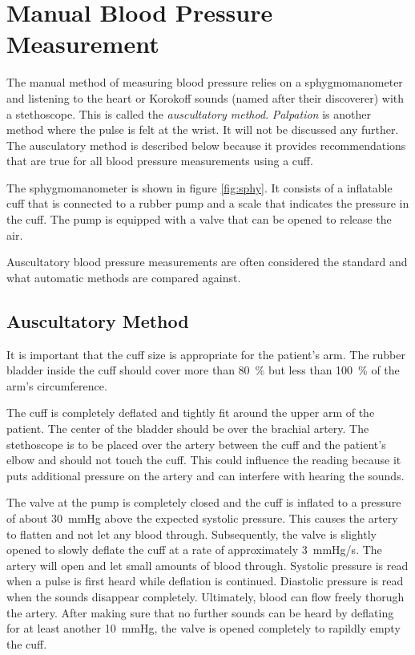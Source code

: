 \section{Manual Blood Pressure Measurement}
The manual method of measuring blood pressure relies on a sphygmomanometer and listening to the heart or Korokoff sounds (named after their discoverer) with a stethoscope. This is called the \emph{auscultatory method}. \emph{Palpation} is another method where the pulse is felt at the wrist. It will not be discussed any further. The ausculatory method is described below because it provides recommendations that are true for all blood pressure measurements using a cuff. 

The sphygmomanometer is shown in figure \ref{fig:sphy}. It consists of a inflatable cuff that is connected to a rubber pump and a scale that indicates the pressure in the cuff. The pump is equipped with a valve that can be opened to release the air.

Auscultatory blood pressure measurements are often considered the standard and what automatic methods are compared against. \cite{Sapinski1996}


\subsection{Auscultatory Method}
It is important that the cuff size is appropriate for the patient's arm. The rubber bladder inside the cuff should cover more than \SI{80}{\%} but less than \SI{100}{\%} of the arm's circumference.

The cuff is completely deflated and tightly fit around the upper arm of the patient. The center of the bladder should be over the brachial artery. The stethoscope is to be placed over the artery between the cuff and the patient's elbow and should not touch the cuff. This could influence the reading because it puts additional pressure on the artery and can interfere with hearing the sounds.\cite{NHS2019}\cite{Reeves1995}

The valve at the pump is completely closed and the cuff is inflated to a pressure of about \SI{30}{\mmHg} above the expected systolic pressure. This causes the artery to flatten and not let any blood through. Subsequently, the valve is slightly opened to slowly deflate the cuff at a rate of approximately \SI{3}{\mmHg/\second}. The artery will open and let small amounts of blood through. Systolic pressure is read when a pulse is first heard while deflation is continued. Diastolic pressure is read when the sounds disappear completely. Ultimately, blood can flow freely thorugh the artery. After making sure that no further sounds can be heard by deflating for at least another \SI{10}{\mmHg}, the valve is opened completely to rapildly empty the cuff.   \cite{NHS2019,Reeves1995}

